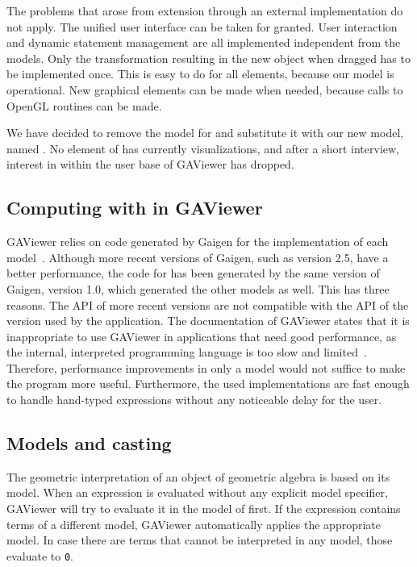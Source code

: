 The problems that arose from extension through an external implementation do not apply.  The unified user interface can be taken for granted.  User interaction and dynamic statement management are all implemented independent from the models.  Only the transformation resulting in the new object when dragged has to be implemented once.  This is easy to do for all elements, because our model is operational.  New graphical elements can be made when needed, because calls to OpenGL routines can be made. 

We have decided to remove the model for \iga{} and substitute it with our new model, named \lga{}.  No element of \iga{} has currently visualizations, and after a short interview, interest in \iga{} within the user base of GAViewer has dropped.

\subsection{Computing with \lga{} in GAViewer}
GAViewer relies on code generated by Gaigen for the implementation of each model~\cite{Gaigen}.  Although more recent versions of Gaigen, such as version 2.5, have a better performance, the code for \lga{} has been generated by the same version of Gaigen, version 1.0, which generated the other models as well.  This has three reasons.  The API of more recent versions are not compatible with the API of the version used by the application.  The documentation of GAViewer states that it is inappropriate to use GAViewer in applications that need good performance, as the internal, interpreted programming language is too slow and limited~\cite[page 7]{GAViewer}.  Therefore, performance improvements in only a model would not suffice to make the program more useful.  Furthermore, the used implementations are fast enough to handle hand-typed expressions without any noticeable delay for the user.

\subsection{Models and casting}
The geometric interpretation of an object of geometric algebra is based on its model.  When an expression is evaluated without any explicit model specifier, GAViewer will try to evaluate it in the model of \ega{} first.  If the expression contains terms of a different model, GAViewer automatically applies the appropriate model.  In case there are terms that cannot be interpreted in any model, those evaluate to \texttt{0}.

